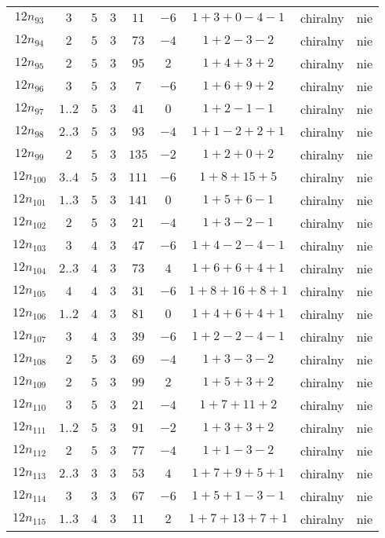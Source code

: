 \begin{longtable}{ccccccccc}
$12n_{93}$ & $3$ & $5$ & $3$ & $11$ & $-6$ & $1+3+0-4-1$ & chiralny & nie \\
$12n_{94}$ & $2$ & $5$ & $3$ & $73$ & $-4$ & $1+2-3-2$ & chiralny & nie \\
$12n_{95}$ & $2$ & $5$ & $3$ & $95$ & $2$ & $1+4+3+2$ & chiralny & nie \\
$12n_{96}$ & $3$ & $5$ & $3$ & $7$ & $-6$ & $1+6+9+2$ & chiralny & nie \\
$12n_{97}$ & $1..2$ & $5$ & $3$ & $41$ & $0$ & $1+2-1-1$ & chiralny & nie \\
$12n_{98}$ & $2..3$ & $5$ & $3$ & $93$ & $-4$ & $1+1-2+2+1$ & chiralny & nie \\
$12n_{99}$ & $2$ & $5$ & $3$ & $135$ & $-2$ & $1+2+0+2$ & chiralny & nie \\
$12n_{100}$ & $3..4$ & $5$ & $3$ & $111$ & $-6$ & $1+8+15+5$ & chiralny & nie \\
$12n_{101}$ & $1..3$ & $5$ & $3$ & $141$ & $0$ & $1+5+6-1$ & chiralny & nie \\
$12n_{102}$ & $2$ & $5$ & $3$ & $21$ & $-4$ & $1+3-2-1$ & chiralny & nie \\
$12n_{103}$ & $3$ & $4$ & $3$ & $47$ & $-6$ & $1+4-2-4-1$ & chiralny & nie \\
$12n_{104}$ & $2..3$ & $4$ & $3$ & $73$ & $4$ & $1+6+6+4+1$ & chiralny & nie \\
$12n_{105}$ & $4$ & $4$ & $3$ & $31$ & $-6$ & $1+8+16+8+1$ & chiralny & nie \\
$12n_{106}$ & $1..2$ & $4$ & $3$ & $81$ & $0$ & $1+4+6+4+1$ & chiralny & nie \\
$12n_{107}$ & $3$ & $4$ & $3$ & $39$ & $-6$ & $1+2-2-4-1$ & chiralny & nie \\
$12n_{108}$ & $2$ & $5$ & $3$ & $69$ & $-4$ & $1+3-3-2$ & chiralny & nie \\
$12n_{109}$ & $2$ & $5$ & $3$ & $99$ & $2$ & $1+5+3+2$ & chiralny & nie \\
$12n_{110}$ & $3$ & $5$ & $3$ & $21$ & $-4$ & $1+7+11+2$ & chiralny & nie \\
$12n_{111}$ & $1..2$ & $5$ & $3$ & $91$ & $-2$ & $1+3+3+2$ & chiralny & nie \\
$12n_{112}$ & $2$ & $5$ & $3$ & $77$ & $-4$ & $1+1-3-2$ & chiralny & nie \\
$12n_{113}$ & $2..3$ & $3$ & $3$ & $53$ & $4$ & $1+7+9+5+1$ & chiralny & nie \\
$12n_{114}$ & $3$ & $3$ & $3$ & $67$ & $-6$ & $1+5+1-3-1$ & chiralny & nie \\
$12n_{115}$ & $1..3$ & $4$ & $3$ & $11$ & $2$ & $1+7+13+7+1$ & chiralny & nie \\

\end{longtable}
